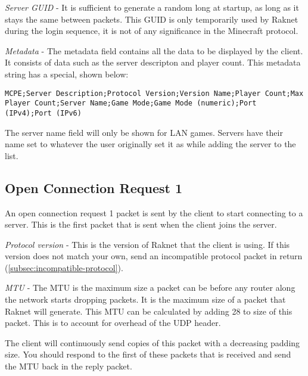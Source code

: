 \textit{Server GUID} - It is sufficient to generate a random long at startup, as long as it stays the same between packets.
This GUID is only temporarily used by Raknet during the login sequence, it is not of any significance in the Minecraft protocol.

\textit{Metadata} - The metadata field contains all the data to be displayed by the client.
It consists of data such as the server descripton and player count.
This metadata string has a special, shown below:

\texttt{MCPE;Server Description;Protocol Version;Version Name;Player Count;Max Player Count;Server Name;Game Mode;Game Mode (numeric);Port (IPv4);Port (IPv6)}

The server name field will only be shown for LAN games.
Servers have their name set to whatever the user originally set it as while adding the server to the list.

\subsection{Open Connection Request 1}\label{subsec:open-connection-request1}

An open connection request 1 packet is sent by the client to start connecting to a server.
This is the first packet that is sent when the client joins the server.


\textit{Protocol version} - This is the version of Raknet that the client is using.
If this version does not match your own, send an incompatible protocol packet in return
(\ref{subsec:incompatible-protocol}). 

\textit{MTU} - The MTU is the maximum size a packet can be before any router along the network
starts dropping packets. It is the maximum size of a packet that Raknet will generate.
This MTU can be calculated by adding 28 to size of this packet. This is to account for overhead of the UDP header.

The client will continuously send copies of this packet with a decreasing padding size.
You should respond to the first of these packets that is received and send the MTU back in the reply packet.

